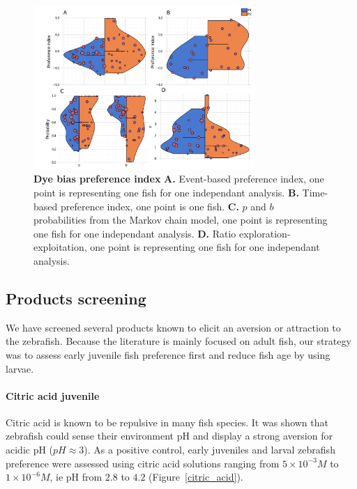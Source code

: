     \begin{figure}[H]
      \centering
      \includegraphics[width=0.75\textwidth]{part_2/assets/dye_pi.png}
      \caption{\textbf{Dye bias preference index} \textbf{A.} Event-based preference index, one point is representing one fish for one independant analysis. \textbf{B.} Time-based preference index, one point is one fish. \textbf{C.} $p$ and $b$ probabilities from the Markov chain model, one point is representing one fish for one independant analysis. \textbf{D.} Ratio exploration-exploitation, one point is representing one fish for one independant analysis.}
      \label{dye_bias}
    \end{figure}

  \subsection{Products screening}
  We have screened several products known to elicit an aversion or attraction to the zebrafish. Because the literature is mainly focused on adult fish, our strategy was to assess early juvenile fish preference first and reduce fish age by using larvae.

  \paragraph{Citric acid juvenile}
  Citric acid is known to be repulsive in many fish species. It was shown that zebrafish could sense their environment pH \cite{abreu2016acute, abreu2016behavioral} and display a strong aversion for acidic pH ($pH \approx 3$). As a positive control, early juveniles and larval zebrafish preference were assessed using citric acid solutions ranging from $5 \times 10^{-3} M$ to $1 \times 10^{-6} M$, ie pH from $2.8$ to $4.2$ (Figure~\ref{citric_acid}).

